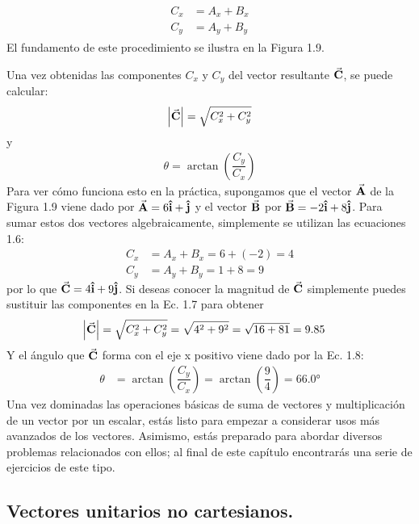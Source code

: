 \documentclass[hidelinks,12pt]{article}
\begin{document}
\begin{align}
\begin{aligned}
    C_{x} &= A_{x} + B_{x} \\
    C_{y} &= A_{y} + B_{y}
\end{aligned}
\label{eq:ecuacion_01_06}
\end{align}
El fundamento de este procedimiento se ilustra en la Figura 1.9.
\par
Una vez obtenidas las componentes $C_{x}$ y $C_{y}$ del vector resultante $\va{C}$, se puede calcular:
\begin{align}
    \abs{\va{C}} = \sqrt{C_{x}^{2} + C_{y}^{2}}
\label{eq:ecuacion_01_07}
\end{align}
y
\begin{align}
    \theta = \arctan \left( \dfrac{C_{y}}{C_{x}} \right)
\label{eq:ecuacion_01_08}
\end{align}
Para ver cómo funciona esto en la práctica, supongamos que el vector $\va{A}$ de la Figura 1.9 viene dado por $\va{A} = 6 \vu{i} + \vu{j}$ y el vector $\va{B}$ por $\va{B} = -2 \vu{i} + 8 \vu{j}$. Para sumar estos dos vectores algebraicamente, simplemente se utilizan las ecuaciones 1.6:
\begin{align*}
    C_{x} &= A_{x} + B_{x} = 6 + (-2) = 4 \\
    C_{y} &= A_{y} + B_{y} = 1 + 8 = 9
\end{align*}
por lo que $\va{C} = 4 \vu{i} + 9 \vu{j}$. Si deseas conocer la magnitud de $\va{C}$ simplemente puedes sustituir las componentes en la Ec. 1.7 para obtener
\begin{align*}
    \abs{\va{C}} &= \sqrt{C_{x}^{2} + C_{y}^{2}} = \sqrt{4^{2} + 9^{2}} = \sqrt{16 + 81} = 9.85
\end{align*}
Y el ángulo que $\va{C}$ forma con el eje {x} positivo viene dado por la Ec. 1.8:
\begin{align*}
    \theta &= \arctan \left( \dfrac{C_{y}}{C_{x}} \right) = \arctan \left( \dfrac{9}{4} \right) = \ang{66.0}
\end{align*}
Una vez dominadas las operaciones básicas de suma de vectores y multiplicación de un vector por un escalar, estás listo para empezar a considerar usos más avanzados de los vectores. Asimismo, estás preparado para abordar diversos problemas relacionados con ellos; al final de este capítulo encontrarás una serie de ejercicios de este tipo.

\subsection{Vectores unitarios no cartesianos.}
\end{document}
